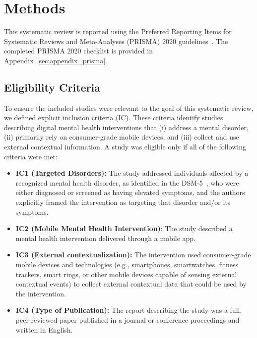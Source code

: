 


\section{Methods}

This systematic review is reported using the Preferred Reporting Items for Systematic Reviews and Meta-Analyses (PRISMA) 2020 guidelines~\cite{page2021prisma}. The completed PRISMA 2020 checklist is provided in Appendix~\ref{sec:appendix_prisma}.  

\subsection{Eligibility Criteria}

To ensure the included studies were relevant to the goal of this systematic review, we defined explicit inclusion criteria (IC). These criteria identify studies describing digital mental health interventions that (i) address a mental disorder, (ii) primarily rely on consumer-grade mobile devices, and (iii) collect and use external contextual information. A study was eligible only if all of the following criteria were met:


\begin{itemize}
    \item \textbf{IC1 (Targeted Disorders):} The study addressed individuals affected by a recognized mental health disorder, as identified in the DSM-5~\cite{APA2022DSM5TR}, who were either diagnosed or screened as having elevated symptoms, and the authors explicitly framed the intervention as targeting that disorder and/or its symptoms.

    \item \textbf{IC2 (Mobile Mental Health Intervention)}: The study described a mental health intervention delivered through a mobile app.
    
    \item \textbf{IC3 (External contextualization):} The intervention used consumer-grade mobile devices and technologies (e.g., smartphones, smartwatches, fitness trackers, smart rings, or other mobile devices capable of sensing external contextual events) to collect external contextual data that could be used by the intervention.

    \item \textbf{IC4 (Type of Publication):} The report describing the study was a full, peer-reviewed paper published in a journal or conference proceedings and written in English.
\end{itemize}

